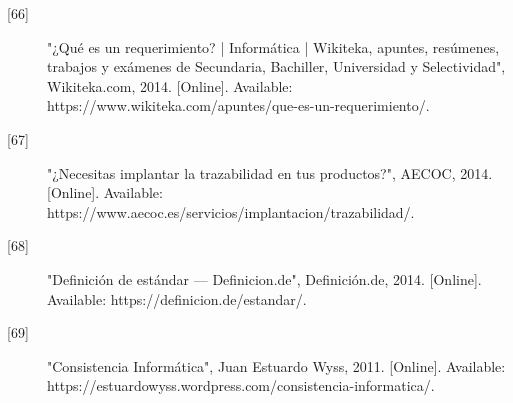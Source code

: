 \begin{description}
		\item[\hypertarget{b66}{[66]}] "¿Qué es un requerimiento? | Informática | Wikiteka, apuntes, resúmenes, trabajos y exámenes de Secundaria, Bachiller, Universidad y Selectividad", Wikiteka.com, 2014. [Online]. Available: https://www.wikiteka.com/apuntes/que-es-un-requerimiento/. 
		
		\item[\hypertarget{b67}{[67]}] "¿Necesitas implantar la trazabilidad en tus productos?", AECOC, 2014. [Online]. Available: https://www.aecoc.es/servicios/implantacion/trazabilidad/. 
		
		\item[\hypertarget{b68}{[68]}] "Definición de estándar — Definicion.de", Definición.de, 2014. [Online]. Available: https://definicion.de/estandar/. 
		
		\item[\hypertarget{b69}{[69]}] "Consistencia Informática", Juan Estuardo Wyss, 2011. [Online]. Available: https://estuardowyss.wordpress.com/consistencia-informatica/. 
\end{description}